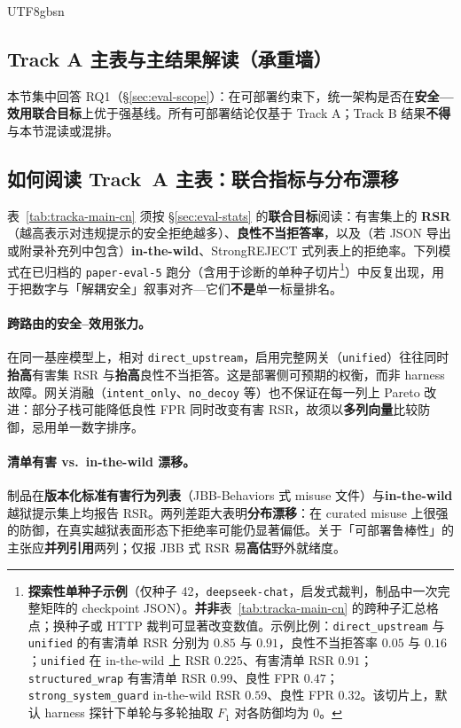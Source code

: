 \documentclass[letterpaper,twocolumn,10pt]{article}
\begin{document}
\begin{CJK}{UTF8}{gbsn}
\subsection{Track A 主表与主结果解读（承重墙）}
\label{sec:eval-tracka-main}

\noindent 本节集中回答 RQ1（\S\ref{sec:eval-scope}）：在可部署约束下，统一架构是否在\textbf{安全—效用联合目标}上优于强基线。所有可部署结论仅基于 Track A；Track B 结果\textbf{不得}与本节混读或混排。



\subsection{如何阅读 Track~A 主表：联合指标与分布漂移}
\label{sec:eval-tracka-readout}

表~\ref{tab:tracka-main-cn} 须按 \S\ref{sec:eval-stats} 的\textbf{联合目标}阅读：有害集上的 \textbf{RSR}（越高表示对违规提示的安全拒绝越多）、\textbf{良性不当拒答率}，以及（若 JSON 导出或附录补充列中包含）\textbf{in-the-wild}、StrongREJECT 式列表上的拒绝率。下列模式在已归档的 \texttt{paper-eval-5} 跑分（含用于诊断的单种子切片\footnote{\textbf{探索性单种子示例}（仅种子 42，\texttt{deepseek-chat}，启发式裁判，制品中一次完整矩阵的 checkpoint JSON）。\textbf{并非}表~\ref{tab:tracka-main-cn} 的跨种子汇总格点；换种子或 HTTP 裁判可显著改变数值。示例比例：\texttt{direct\_upstream} 与 \texttt{unified} 的有害清单 RSR 分别为 $0.85$ 与 $0.91$，良性不当拒答率 $0.05$ 与 $0.16$；\texttt{unified} 在 in-the-wild 上 RSR $0.225$、有害清单 RSR $0.91$；\texttt{structured\_wrap} 有害清单 RSR $0.99$、良性 FPR $0.47$；\texttt{strong\_system\_guard} in-the-wild RSR $0.59$、良性 FPR $0.32$。该切片上，默认 harness 探针下单轮与多轮抽取 $F_1$ 对各防御均为 $0$。}）中反复出现，用于把数字与「解耦安全」叙事对齐---它们\textbf{不是}单一标量排名。

\paragraph{跨路由的安全--效用张力。}
在同一基座模型上，相对 \texttt{direct\_upstream}，启用完整网关（\texttt{unified}）往往同时\textbf{抬高}有害集 RSR 与\textbf{抬高}良性不当拒答。这是部署侧可预期的权衡，而非 harness 故障。网关消融（\texttt{intent\_only}、\texttt{no\_decoy} 等）也不保证在每一列上 Pareto 改进：部分子栈可能降低良性 FPR 同时改变有害 RSR，故须以\textbf{多列向量}比较防御，忌用单一数字排序。

\paragraph{清单有害 vs.\ in-the-wild 漂移。}
制品在\textbf{版本化标准有害行为列表}（JBB-Behaviors 式 misuse 文件）与\textbf{in-the-wild} 越狱提示集上均报告 RSR。两列差距大表明\textbf{分布漂移}：在 curated misuse 上很强的防御，在真实越狱表面形态下拒绝率可能仍显著偏低。关于「可部署鲁棒性」的主张应\textbf{并列引用}两列；仅报 JBB 式 RSR 易\textbf{高估}野外就绪度。


\end{CJK}
\end{document}
